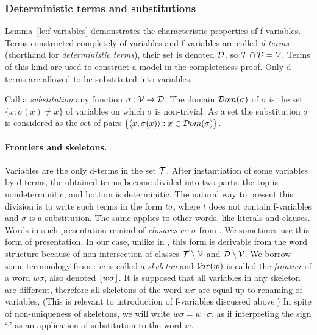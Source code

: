 \subsubsection{Deterministic terms and substitutions}
%
Lemma~\ref {le:f-variables}
demonstrates the characteristic properties of f-variables.  
Terms constructed completely
of variables and f-variables are called {\em d-terms} (shorthand for {\em
deterministic terms}), their set is denoted ${\cal D}$, so \({\cal T} \cap
{\cal D} ={\cal V}\).  Terms of this kind are used to construct a model in the
completeness proof.  Only d-terms are allowed to be substituted into
variables.

\begin{definition}\label{def:substitution}
Call a {\em substitution} any function \(\sigma:{\cal V} \to {\cal D}\).  The
domain \({\sl{\cal D}om} (\sigma)\) of $\sigma$ is the set \(\{x: \sigma(x) \neq x\}\)
of variables on which $\sigma$ is non-trivial.  As a set the substitution
$\sigma$ is considered as the set of pairs \(\{\langle x,\sigma(x)\rangle: x\in{\sl{\cal D}om}
(\sigma)\}\).
\end{definition}

\paragraph{Frontiers and skeletons.}  

Variables are the only d-terms in the
set ${\cal T}$.  After instantiation of some variables by d-terms, the
obtained terms become divided into two parts: the top is nondeterminitic, and
bottom is determinitic.  The natural way to present this division is to write
such terms in the form \(t\sigma\), where $t$ does not contain f-variables
and $\sigma$ is a substitution.  The same applies to other words, like
literals and clauses.  Words in such presentation remind of {\em
closures} \(w\cdot \sigma\) from \cite {Basic-par}.  We sometimes use this
form of presentation.  In our case, unlike in \cite {Basic-par},
this form is derivable from the word structure because of non-intersection of
classes \({\cal T} \setminus {\cal V}\) and \({\cal D} \setminus {\cal V}\).  We
borrow some terminology from \cite {Basic-par}: $w$ is called a {\em
skeleton} and \({\sl{\cal V}\!ar}(w)\) is called the {\em frontier} of a word \(w\sigma\),
also denoted \(\lfloor w\sigma\rfloor\).  It is supposed that all variables in
any skeleton are different, therefore all skeletons of the word \(w\sigma\)
are equal up to renaming of variables.  (This is relevant to introduction of
f-variables discussed above.)  In spite of non-uniqueness of skeletons, we
will write \(w\sigma=w\cdot \sigma\), as if interpreting the sign
`$\cdot $' as an application of substitution to the word $w$.

